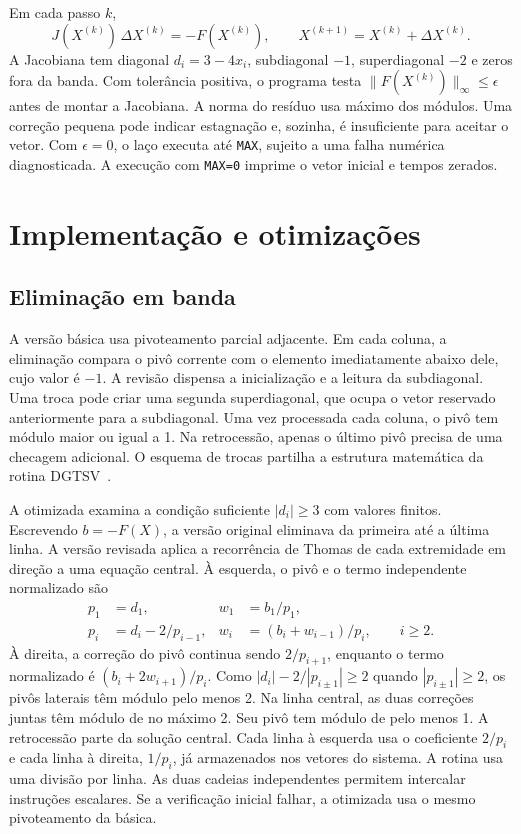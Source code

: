 \documentclass[11pt,a4paper]{article}
\begin{document}
Em cada passo $k$,
\begin{equation}
J(X^{(k)})\,\Delta X^{(k)}=-F(X^{(k)}),\qquad
X^{(k+1)}=X^{(k)}+\Delta X^{(k)}.
\end{equation}
A Jacobiana tem diagonal $d_i=3-4x_i$, subdiagonal $-1$, superdiagonal $-2$ e zeros fora da banda. Com tolerância positiva, o programa testa $\|F(X^{(k)})\|_\infty\le\epsilon$ antes de montar a Jacobiana. A norma do resíduo usa máximo dos módulos. Uma correção pequena pode indicar estagnação e, sozinha, é insuficiente para aceitar o vetor. Com $\epsilon=0$, o laço executa até \texttt{MAX}, sujeito a uma falha numérica diagnosticada. A execução com \texttt{MAX=0} imprime o vetor inicial e tempos zerados.

\section{Implementação e otimizações}

\subsection{Eliminação em banda}

A versão básica usa pivoteamento parcial adjacente. Em cada coluna, a eliminação compara o pivô corrente com o elemento imediatamente abaixo dele, cujo valor é $-1$. A revisão dispensa a inicialização e a leitura da subdiagonal. Uma troca pode criar uma segunda superdiagonal, que ocupa o vetor reservado anteriormente para a subdiagonal. Uma vez processada cada coluna, o pivô tem módulo maior ou igual a 1. Na retrocessão, apenas o último pivô precisa de uma checagem adicional. O esquema de trocas partilha a estrutura matemática da rotina DGTSV~\cite{lapack}.

A otimizada examina a condição suficiente $|d_i|\ge 3$ com valores finitos. Escrevendo $b=-F(X)$, a versão original eliminava da primeira até a última linha. A versão revisada aplica a recorrência de Thomas de cada extremidade em direção a uma equação central. À esquerda, o pivô e o termo independente normalizado são
\begin{align*}
p_1 &= d_1, & w_1 &= b_1/p_1,\\
p_i &= d_i-2/p_{i-1}, & w_i &= (b_i+w_{i-1})/p_i, \qquad i\ge2.
\end{align*}
À direita, a correção do pivô continua sendo $2/p_{i+1}$, enquanto o termo normalizado é $(b_i+2w_{i+1})/p_i$. Como $|d_i|-2/|p_{i\pm1}|\ge2$ quando $|p_{i\pm1}|\ge2$, os pivôs laterais têm módulo pelo menos 2. Na linha central, as duas correções juntas têm módulo de no máximo 2. Seu pivô tem módulo de pelo menos 1. A retrocessão parte da solução central. Cada linha à esquerda usa o coeficiente $2/p_i$ e cada linha à direita, $1/p_i$, já armazenados nos vetores do sistema. A rotina usa uma divisão por linha. As duas cadeias independentes permitem intercalar instruções escalares. Se a verificação inicial falhar, a otimizada usa o mesmo pivoteamento da básica.
\end{document}

